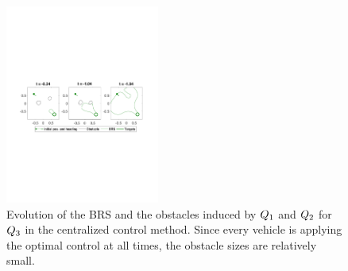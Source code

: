 \begin{figure}[H]
  \centering
  \includegraphics[width=0.45\textwidth]{"fig/cc_rs3"}
  \caption{Evolution of the BRS and the obstacles induced by $Q_1$ and $Q_2$ for $Q_3$ in the centralized control method. Since every vehicle is applying the optimal control at all times, the obstacle sizes are relatively small.}
  \label{fig:cc_rs3}
  \vspace{-1.2em}
\end{figure}